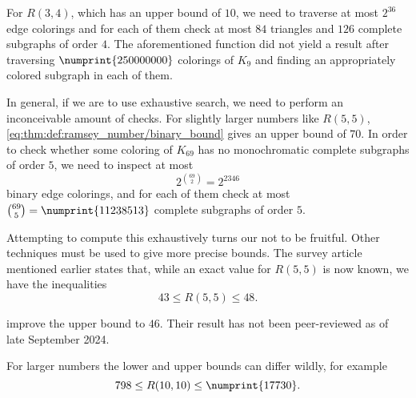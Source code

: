 \begin{remark}
  For \( R(3, 4) \), which has an upper bound of \( 10 \), we need to traverse at most \( 2^{36} \) edge colorings and for each of them check at most \( 84 \) triangles and \( 126 \) complete subgraphs of order \( 4 \). The aforementioned function did not yield a result after traversing \( \numprint{250 000 000} \) colorings of \( K_9 \) and finding an appropriately colored subgraph in each of them.

  In general, if we are to use exhaustive search, we need to perform an inconceivable amount of checks. For slightly larger numbers like \( R(5, 5) \), \eqref{eq:thm:def:ramsey_number/binary_bound} gives an upper bound of \( 70 \). In order to check whether some coloring of \( K_{69} \) has no monochromatic complete subgraphs of order \( 5 \), we need to inspect at most
  \begin{equation*}
    2^{\binom {69} 2} = 2^{2346}
  \end{equation*}
  binary edge colorings, and for each of them check at most \( \binom {69} 5 = \numprint{11 238 513} \) complete subgraphs of order \( 5 \).

  Attempting to compute this exhaustively turns our not to be fruitful. Other techniques must be used to give more precise bounds. The survey article \cite[4]{Radziszowski2021RamseyNumbers} mentioned earlier states that, while an exact value for \( R(5, 5) \) is now known, we have the inequalities
  \begin{equation*}
    43 \leq R(5, 5) \leq 48.
  \end{equation*}

   improve the upper bound to \( 46 \). Their result has not been peer-reviewed as of late September 2024.

  For larger numbers the lower and upper bounds can differ wildly, for example
  \begin{equation*}
    798 \leq R(10, 10) \leq \numprint{17 730}.
  \end{equation*}
\end{remark}
